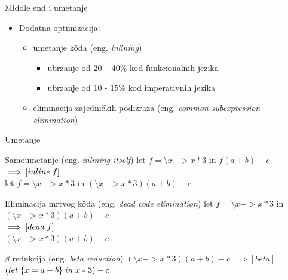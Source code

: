 \documentclass{beamer}
\begin{document}
\begin{frame}{Middle end i umetanje}
	\begin{itemize}
		\item Dodatna optimizacija:
		\begin{itemize}
			\item  umetanje k\^{o}da (eng. \emph{inlining})
			\begin{itemize}
				\item ubrzanje  od 20 – 40\% kod funkcionalnih jezika
				\item ubrzanje od  10 - 15\% kod imperativnih jezika
			\end{itemize}
			\item  eliminacija zajedničkih podizraza (eng. \emph{common subexpression elimination})
		\end{itemize}
	\end{itemize}
\end{frame}

\begin{frame}[fragile]{Umetanje}
		\begin{block}{Samoumetanje (eng. \emph{inlining itself})}
			let $  f = \setminus x -> x*3  $ in $  f (a + b) - c $
			\\$ \implies [inline \hspace{1mm} f] $
			\\let $  f = \setminus x -> x*3  $ in $ (\setminus x -> x*3) (a + b) - c $
		\end{block}
		\begin{block}{Eliminacija mrtvog k\^{o}da (eng. \emph{dead code elimination}) }
			let  $ f = \setminus x -> x*3 $ in $ (\setminus x -> x*3) (a + b) - c $
			\\$ \implies [dead \hspace{1mm} f] $
			\\$ (\setminus x -> x*3) (a + b) - c $
		\end{block}
		\begin{block}{$\beta$  redukcija (eng. \emph{beta reduction})}
		$ (\setminus x -> x*3) (a + b) - c $
		$ \implies [beta] $
		$ (let  \hspace{1mm}  \{ x = a+b \}  \hspace{1mm}  in  \hspace{1mm}  x*3) - c $
		\end{block}
\end{frame}
\end{document}
